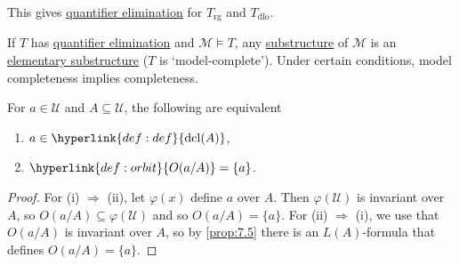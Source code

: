 \documentclass{article}
\let\models\vDash
\DeclareMathOperator{\dcl}{dcl}
\DeclareMathOperator{\acl}{acl}
\begin{document}
This gives \hyperlink{def:qe}{quantifier elimination} for $T_{\text{rg}}$ and $T_{\text{dlo}}$.
\begin{remark}
  If $T$ has \hyperlink{def:qe}{quantifier elimination} and $\mathcal{M} \models T$, any \hyperlink{def:subs}{substructure} of $\mathcal{M}$ is an \hyperlink{def:elsubs}{elementary substructure} ($T$ is `model-complete'). Under certain conditions, model completeness implies completeness.
\end{remark}
\begin{nprop}\label{prop:7.11}
  For $a \in \mathcal{U}$ and $A \subseteq \mathcal{U}$, the following are equivalent
  \begin{enumerate}[label=(\roman*)]
    \item $a \in \hyperlink{def:def}{\dcl(A)}$,
    \item $\hyperlink{def:orbit}{O(a/A)} = \{a\}$. %
  \end{enumerate}
\end{nprop}
\begin{proof}
  For (i) $\Rightarrow$ (ii), let $\varphi(x)$ define $a$ over $A$. Then $\varphi(\mathcal{U})$ is invariant over $A$, so $O(a/A) \subseteq \varphi(\mathcal{U})$ and so $O(a/A) = \{a\}$. For (ii) $\Rightarrow$ (i), we use that $O(a/A)$ is invariant over $A$, so by \cref{prop:7.5} there is an $L(A)$-formula that defines $O(a/A) =\{a\}$.
\end{proof}
\end{document}
